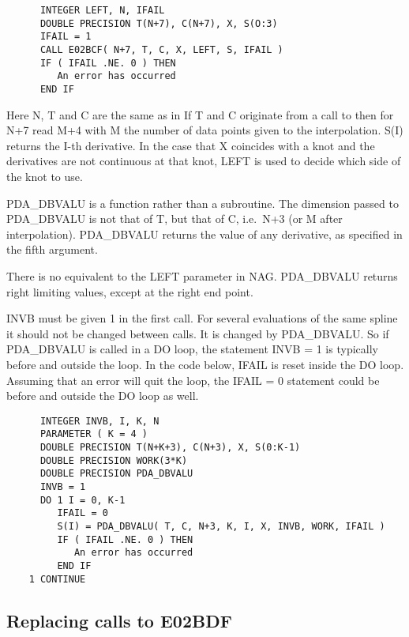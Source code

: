 \begin{verbatim}
      INTEGER LEFT, N, IFAIL
      DOUBLE PRECISION T(N+7), C(N+7), X, S(O:3)
      IFAIL = 1
      CALL E02BCF( N+7, T, C, X, LEFT, S, IFAIL )
      IF ( IFAIL .NE. 0 ) THEN
         An error has occurred
      END IF
\end{verbatim}

   Here N, T and C are the same as in
   If T and C originate from
   a call to
   then for N+7 read M+4 with M the number of data
   points given to the interpolation. S(I) returns the I-th derivative.
   In the case that X coincides with a knot and the derivatives are not
   continuous at that knot, LEFT is used to decide which side of the
   knot to use.

   PDA\_DBVALU is a function rather than a subroutine. The dimension passed
   to PDA\_DBVALU is not that of T, but that of C, i.e.\ N+3 (or M after
   interpolation). PDA\_DBVALU returns the value of any derivative, as
   specified in the fifth argument.

   There is no equivalent to
   the LEFT parameter in NAG. PDA\_DBVALU returns right limiting values,
   except at the right end point.

   INVB must be given 1 in the first call. For several evaluations of
   the same spline it should not be changed between calls. It is changed
   by PDA\_DBVALU. So if PDA\_DBVALU is called in a DO loop, the statement INVB =
   1 is typically before and outside the loop. In the code below, IFAIL
   is reset inside the DO loop. Assuming that an error will quit the
   loop, the IFAIL = 0 statement could be before and outside the DO loop
   as well.

\begin{verbatim}
      INTEGER INVB, I, K, N
      PARAMETER ( K = 4 )
      DOUBLE PRECISION T(N+K+3), C(N+3), X, S(0:K-1)
      DOUBLE PRECISION WORK(3*K)
      DOUBLE PRECISION PDA_DBVALU
      INVB = 1
      DO 1 I = 0, K-1
         IFAIL = 0
         S(I) = PDA_DBVALU( T, C, N+3, K, I, X, INVB, WORK, IFAIL )
         IF ( IFAIL .NE. 0 ) THEN
            An error has occurred
         END IF
    1 CONTINUE
\end{verbatim}


\subsection{Replacing calls to E02BDF}

